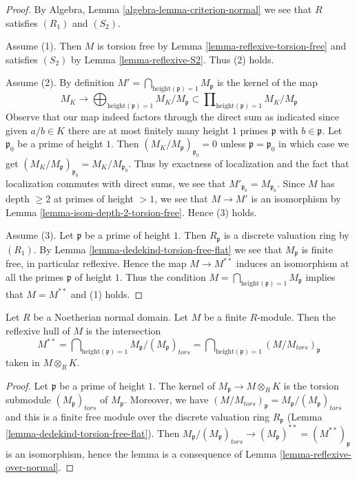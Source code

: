 \begin{proof}
By Algebra, Lemma \ref{algebra-lemma-criterion-normal}
we see that $R$ satisfies $(R_1)$ and $(S_2)$.

\medskip\noindent
Assume (1). Then $M$ is torsion free by Lemma \ref{lemma-reflexive-torsion-free}
and satisfies $(S_2)$ by Lemma \ref{lemma-reflexive-S2}.
Thus (2) holds.

\medskip\noindent
Assume (2). By definition
$M' = \bigcap_{\text{height}(\mathfrak p) = 1} M_{\mathfrak p}$
is the kernel of the map
$$
M_K
\longrightarrow
\bigoplus\nolimits_{\text{height}(\mathfrak p) = 1} M_K/M_\mathfrak p
\subset
\prod\nolimits_{\text{height}(\mathfrak p) = 1} M_K/M_\mathfrak p
$$
Observe that our map indeed factors through the direct sum as indicated
since given
$a/b \in K$ there are at most finitely many height $1$ primes $\mathfrak p$
with $b \in \mathfrak p$. Let $\mathfrak p_0$ be a prime of height $1$.
Then $(M_K/M_\mathfrak p)_{\mathfrak p_0} = 0$ unless
$\mathfrak p = \mathfrak p_0$ in which case we get
$(M_K/M_\mathfrak p)_{\mathfrak p_0} = M_K/M_{\mathfrak p_0}$.
Thus by exactness of localization and the fact that localization
commutes with direct sums, we see that
$M'_{\mathfrak p_0} = M_{\mathfrak p_0}$.
Since $M$ has depth $\geq 2$ at primes of height $> 1$,
we see that $M \to M'$ is an isomorphism by
Lemma \ref{lemma-isom-depth-2-torsion-free}. Hence (3) holds.

\medskip\noindent
Assume (3). Let $\mathfrak p$ be a prime of height $1$.
Then $R_\mathfrak p$ is a discrete valuation ring by $(R_1)$.
By Lemma \ref{lemma-dedekind-torsion-free-flat}
we see that $M_\mathfrak p$ is finite free, in particular
reflexive. Hence the map $M \to M^{**}$ induces an isomorphism at all
the primes $\mathfrak p$ of height $1$. Thus the condition
$M = \bigcap_{\text{height}(\mathfrak p) = 1} M_{\mathfrak p}$
implies that $M = M^{**}$ and (1) holds.
\end{proof}

\begin{lemma}
\label{lemma-describe-reflexive-hull}
Let $R$ be a Noetherian normal domain. Let $M$ be a finite $R$-module.
Then the reflexive hull of $M$ is the intersection
$$
M^{**} =
\bigcap\nolimits_{\text{height}(\mathfrak p) = 1}
M_{\mathfrak p}/(M_\mathfrak p)_{tors} =
\bigcap\nolimits_{\text{height}(\mathfrak p) = 1}
(M/M_{tors})_\mathfrak p
$$
taken in $M \otimes_R K$.
\end{lemma}

\begin{proof}
Let $\mathfrak p$ be a prime of height $1$.
The kernel of $M_\mathfrak p \to M \otimes_R K$ is the
torsion submodule $(M_\mathfrak p)_{tors}$ of $M_\mathfrak p$.
Moreover, we have
$(M/M_{tors})_\mathfrak p = M_\mathfrak p/(M_\mathfrak p)_{tors}$
and this is a finite free module over the discrete valuation ring
$R_\mathfrak p$
(Lemma \ref{lemma-dedekind-torsion-free-flat}).
Then $M_\mathfrak p/(M_\mathfrak p)_{tors} \to
(M_\mathfrak p)^{**} = (M^{**})_\mathfrak p$
is an isomorphism, hence the lemma is a consequence of
Lemma \ref{lemma-reflexive-over-normal}.
\end{proof}

